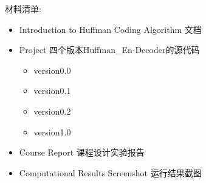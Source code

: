 \documentclass{ctexart}
\begin{document}
材料清单:

\begin{itemize}
\item
  Introduction to Huffman Coding Algorithm 文档
\item
  Project 四个版本Huffman\_En-Decoder的源代码

  \begin{itemize}
  \item
    version0.0
  \item
    version0.1
  \item
    version0.2
  \item
    version1.0
  \end{itemize}
\item
  Course Report 课程设计实验报告
\item
  Computational Results Screenshot 运行结果截图
\end{itemize}


\end{document}
